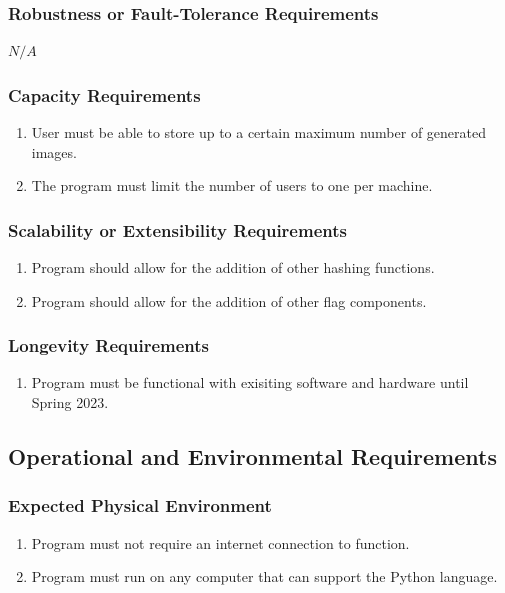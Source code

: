 \documentclass[12pt, titlepage]{article}
\begin{document}
\subsubsection{Robustness or Fault-Tolerance Requirements}
$N/A$
\subsubsection{Capacity Requirements}
\begin{enumerate}[label=PE\arabic*., resume=pes]
    \item User must be able to store up to a certain maximum number of generated images.
    \item The program must limit the number of users to one per machine.
\end{enumerate} 

\subsubsection{Scalability or Extensibility Requirements}
\begin{enumerate}[label=PE\arabic*., resume=pes]
    \item Program should allow for the addition of other hashing functions.
    \item Program should allow for the addition of other flag components.
\end{enumerate} 
\subsubsection{Longevity Requirements}
\begin{enumerate}[label=PE\arabic*., resume=pes]
    \item Program must be functional with exisiting software and hardware until Spring 2023.
\end{enumerate} 
\subsection{Operational and Environmental Requirements}
\subsubsection{Expected Physical Environment}
\begin{enumerate}[label=PE\arabic*., resume=pes]
    \item Program must not require an internet connection to function.
    \item Program must run on any computer that can support the Python language.
\end{enumerate} 
\end{document}
